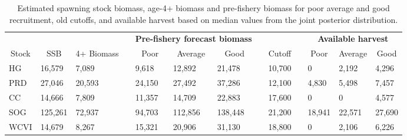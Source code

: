 %
\begin{table}[!tbp]
 \small
 \caption{Estimated spawning stock biomass,  age-4+ biomass and pre-fishery
			biomass for poor average and good recruitment, old cutoffs,  and 
			available harvest based on median values from the joint posterior distribution.\label{TableCatchAdviceOldCuttoffs}} 
 \begin{center}
 \begin{tabular}{lllclllclclll}\hline\hline
\multicolumn{3}{c}{\bfseries }&
\multicolumn{1}{c}{\bfseries }&
\multicolumn{3}{c}{\bfseries Pre-fishery forecast biomass}&
\multicolumn{1}{c}{\bfseries }&
\multicolumn{1}{c}{\bfseries }&
\multicolumn{1}{c}{\bfseries }&
\multicolumn{3}{c}{\bfseries Available harvest}
\tabularnewline \cline{1-13}
\multicolumn{1}{c}{Stock}&\multicolumn{1}{c}{SSB}&\multicolumn{1}{c}{4+ Biomass}&\multicolumn{1}{c}{}&\multicolumn{1}{c}{Poor}&\multicolumn{1}{c}{Average}&\multicolumn{1}{c}{Good}&\multicolumn{1}{c}{}&\multicolumn{1}{c}{Cutoff}&\multicolumn{1}{c}{}&\multicolumn{1}{c}{Poor}&\multicolumn{1}{c}{Average}&\multicolumn{1}{c}{Good}\tabularnewline
\hline
HG&16,579& 7,089&& 9,618&12,892&21,478&&10,700&&     0& 2,192& 4,296\tabularnewline
PRD&27,046&20,593&&24,150&27,492&37,286&&12,100&& 4,830& 5,498& 7,457\tabularnewline
CC&14,666& 7,809&&11,357&14,709&22,883&&17,600&&     0&     0& 4,577\tabularnewline
SOG&125,261& 72,937&& 94,703&112,856&138,448&& 21,200&& 18,941& 22,571& 27,690\tabularnewline
WCVI&14,679& 8,267&&15,321&20,906&31,130&&18,800&&     0& 2,106& 6,226\tabularnewline
\hline
\end{tabular}

\end{center}

\end{table}

